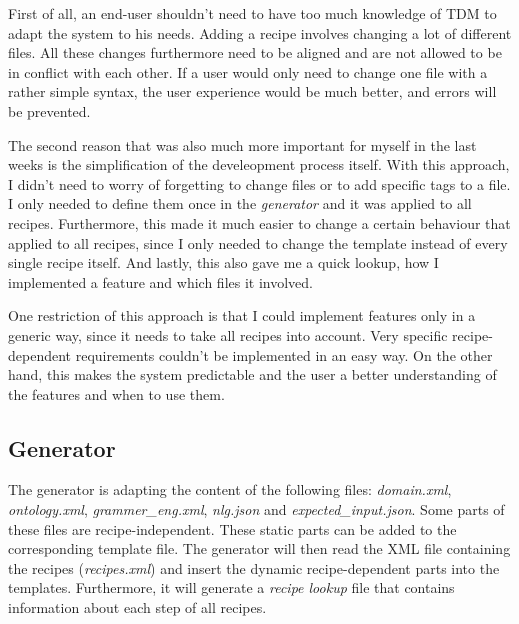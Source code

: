 \documentclass[
	11pt, %
]{fphw}
\begin{document}
First of all, an end-user shouldn't need to have too much knowledge of TDM to adapt the system to his needs. Adding a recipe involves changing a lot of different files. All these changes furthermore need to be aligned and are not allowed to be in conflict with each other. If a user would only need to change one file with a rather simple syntax, the user experience would be much better, and errors will be prevented.

The second reason that was also much more important for myself in the last weeks is the simplification of the develeopment process itself. With this approach, I didn't need to worry of forgetting to change files or to add specific tags to a file. I only needed to define them once in the \emph{generator} and it was applied to all recipes. Furthermore, this made it much easier to change a certain behaviour that applied to all recipes, since I only needed to change the template instead of every single recipe itself. And lastly, this also gave me a quick lookup, how I implemented a feature and which files it involved.

One restriction of this approach is that I could implement features only in a generic way, since it needs to take all recipes into account. Very specific recipe-dependent requirements couldn't be implemented in an easy way. On the other hand, this makes the system predictable and the user a better understanding of the features and when to use them.

\subsection*{Generator}
The generator is adapting the content of the following files: \emph{domain.xml}, \emph{ontology.xml}, \emph{grammer\_eng.xml}, \emph{nlg.json} and \emph{expected\_input.json}. Some parts of these files are recipe-independent. These static parts can be added to the corresponding template file. The generator will then read the XML file containing the recipes (\emph{recipes.xml}) and insert the dynamic recipe-dependent parts into the templates. Furthermore, it will generate a \emph{recipe lookup} file that contains information about each step of all recipes.
\end{document}

